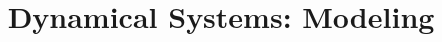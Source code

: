 \documentclass{beamer}
\title[Section 1.1]{Dynamical Systems: Modeling}
\begin{document}
\begin{frame}
\titlepage
\end{frame}
\end{document}
